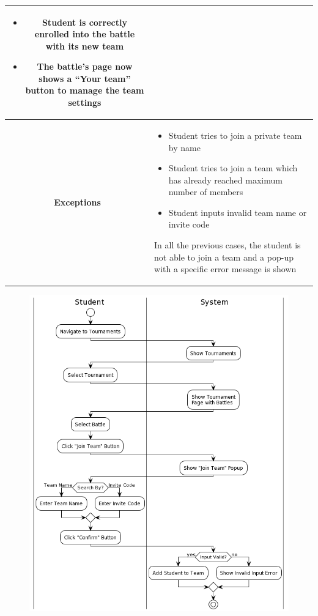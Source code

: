 \begin{center}
\begin{tabular}{ |c|m{10cm}| }
        \begin{itemize}
            \item Student is correctly enrolled into the battle with its new team
            \item The battle’s page now shows a “Your team” button to manage the team settings
        \end{itemize} \\
        \hline
        \textbf{Exceptions} & 
        \begin{itemize}
            \item Student tries to join a private team by name
            \item Student tries to join a team which has already reached maximum number of members
            \item Student inputs invalid team name or invite code
        \end{itemize} 
        In all the previous cases, the student is not able to join a team and a pop-up with a specific error message is shown \\
        \hline
    \end{tabular}
    \begin{figure}[H]
        \hspace{30px}
        \includegraphics[scale=0.5]{Diagrams/activity_jointeam.png}

\end{figure}
\end{center}
